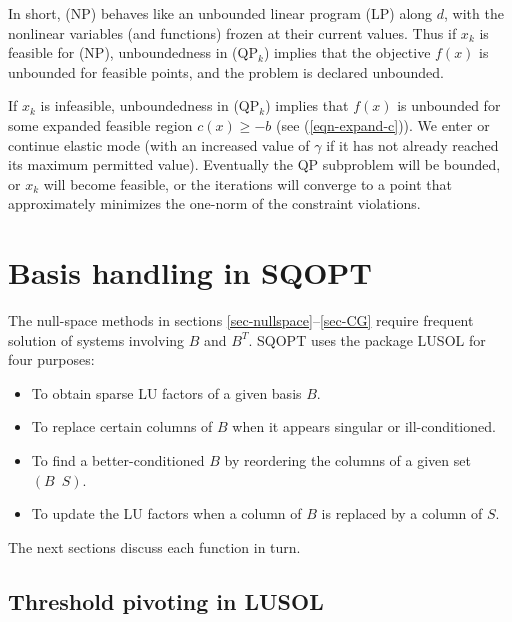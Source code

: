 \documentclass[draft,leqno,onefignum,onetabnum]{siamltex}
\def\T{^T\!}
\def\QPk {QP$_k$}
\def\LUSOL {{\small LUSOL}}
\def\SQOPT {{\small SQOPT}}
\begin{document}
In short, (NP) behaves like an unbounded linear program (LP) along
$d$, with the nonlinear variables (and functions) frozen at their
current values.  Thus if $x_k$ is feasible for (NP), unboundedness in
(\QPk) implies that the objective $f(x)$ is unbounded for feasible
points, and the problem is declared unbounded.

If $x_k$ is infeasible, unboundedness in (\QPk) implies that $f(x)$ is
unbounded for some expanded feasible region $c(x) \ge - b$
(see (\ref{eqn-expand-c})).
We enter or continue elastic mode (with an increased value of $\gamma$
if it has not already reached its maximum permitted value).
Eventually the QP subproblem will be bounded,
or $x_k$ will become feasible,
or the iterations will converge to a point that approximately
minimizes the one-norm of the constraint violations.









 \section{Basis handling in SQOPT} \label{sec-basis}

The null-space methods in sections \ref{sec-nullspace}--\ref{sec-CG}
require frequent solution of systems involving $B$ and $B\T$.
\SQOPT{} uses the package \LUSOL{} \cite{GilMSW87c} for four
purposes:
\begin{itemize}
\item To obtain sparse LU factors of a given basis $B$.
\item To replace certain columns of $B$
      when it appears singular or ill-conditioned.
\item To find a better-conditioned $B$ by reordering
      the columns of a given set $(B\ \;S)$.
\item To update the LU factors when a column of $B$ is
      replaced by a column of $S$.
\end{itemize}
The next sections discuss each function in turn.


 \subsection{Threshold pivoting in LUSOL}   \label{sec-TCP}
\end{document}
